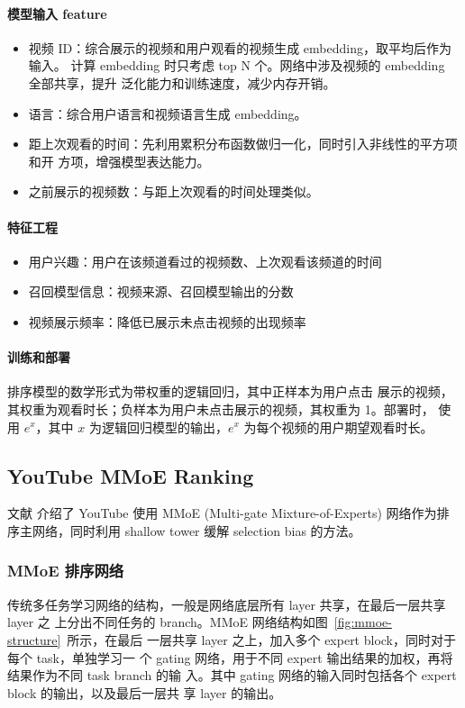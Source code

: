 \paragraph{模型输入 feature}
\begin{itemize}
  \item 视频 ID：综合展示的视频和用户观看的视频生成 embedding，取平均后作为输入。
    计算 embedding 时只考虑 top N 个。网络中涉及视频的 embedding 全部共享，提升
    泛化能力和训练速度，减少内存开销。
  \item 语言：综合用户语言和视频语言生成 embedding。
  \item 距上次观看的时间：先利用累积分布函数做归一化，同时引入非线性的平方项和开
    方项，增强模型表达能力。
  \item 之前展示的视频数：与距上次观看的时间处理类似。
\end{itemize}

\paragraph{特征工程}
\begin{itemize}
  \item 用户兴趣：用户在该频道看过的视频数、上次观看该频道的时间
  \item 召回模型信息：视频来源、召回模型输出的分数
  \item 视频展示频率：降低已展示未点击视频的出现频率
\end{itemize}

\paragraph{训练和部署} 排序模型的数学形式为带权重的逻辑回归，其中正样本为用户点击
展示的视频，其权重为观看时长；负样本为用户未点击展示的视频，其权重为 1。部署时，
使用 $e^{x}$，其中 $x$ 为逻辑回归模型的输出，$e^x$ 为每个视频的用户期望观看时长。

\subsection{YouTube MMoE Ranking}
文献  介绍了 YouTube 使用 MMoE (Multi-gate
Mixture-of-Experts) 网络作为排序主网络，同时利用 shallow tower 缓解 selection
bias 的方法。

\subsubsection{MMoE 排序网络}
传统多任务学习网络的结构，一般是网络底层所有 layer 共享，在最后一层共享 layer 之
上分出不同任务的 branch。MMoE 网络结构如图~\ref{fig:mmoe-structure}~所示，在最后
一层共享 layer 之上，加入多个 expert block，同时对于每个 task，单独学习一
个 gating 网络，用于不同 expert 输出结果的加权，再将结果作为不同 task branch 的输
入。其中 gating 网络的输入同时包括各个 expert block 的输出，以及最后一层共
享 layer 的输出。

